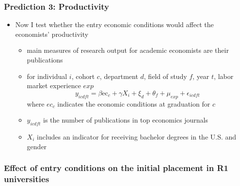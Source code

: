 \documentclass[11pt]{beamer}
\begin{document}
\begin{frame}
	\frametitle{Prediction 3: Productivity}
	\begin{itemize}
		\item Now I test whether the entry economic conditions would affect the economists' productivity
		\begin{itemize}
			\item main measures of research output for academic economists are their publications
			\item for individual $i$, cohort $c$,  department $d$, field of study $f$, year $t$, labor market experience $exp$
			\begin{equation*}
				y_{icdft} = \beta \text{ec}_{c}+\gamma X_{i}+\xi_{d}+\theta_f +\mu_{exp}  +\epsilon_{icdft}
			\end{equation*}
			where $ec_c$ indicates the economic conditions at graduation for $c$
			\item $y_{icdft}$ is the number of publications in top  economics journals
			\item $X_i$ includes an indicator for receiving bachelor degrees in the U.S. and gender 
		\end{itemize}
	\end{itemize}
\end{frame}



{
	\begin{frame}
		\frametitle{Effect of entry conditions on the initial placement in R1 universities}
		
	\end{frame}
}
\end{document}
